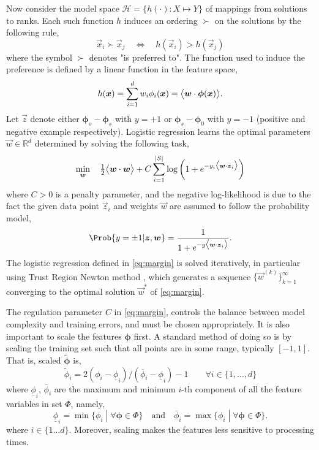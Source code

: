 \documentclass[smallextended]{svjour3}
\renewcommand{\vphi}{\bm \phi}
\begin{document}
Now consider the model space $\mathcal{H} = \{h(\cdot) : X \mapsto Y\}$ of mappings from solutions to ranks. Each such function $h$ induces an ordering $\succ$ on the solutions  by the following rule,
\begin{equation}\label{eq:linear}
\vec{x}_i \succ \vec{x}_j \quad \Leftrightarrow \quad h(\vec{x}_i) > h(\vec{x}_j)
\end{equation}
where the symbol $\succ$ denotes "is preferred to".  The function used to induce the preference is defined by a linear function in the feature space,
\begin{equation}\label{eq:jssp:linweights}
h(\vec{x})=\sum_{i=1}^d w_i\phi_i(\vec{x})=\inner{\vec{w}}{\vphi(\vec{x})}.
\end{equation}
Let $\vec{z}$ denote either $\vphi_o-\vphi_s$ with $y=+1$ or $\vphi_s-\vphi_0$ with $y=-1$ (positive and negative example respectively). Logistic regression learns the optimal parameters $\vec{w}\in\mathbb{R}^d$ determined by solving the following task, 
\begin{equation}\label{eq:margin}
\min_{\vec{w}}\quad \tfrac{1}{2}\inner{\vec{w}}{\vec{w}} + C \sum_{i=1}^{\abs{S}} \log\left(1 + e^{-y_i \inner{\vec{w}}{\vec{z}_i}}\right) 
\end{equation}
where $C > 0$ is a penalty parameter, and the negative log-likelihood is due to the fact the given data point $\vec{z}_i$ and weights $\vec{w}$ are assumed to follow the probability model,
\begin{equation}\label{eq:prob}
\Prob{y=\pm1|\vec{z},\vec{w}}=\frac{1}{1+e^{-y\inner{\vec{w}}{\vec{z}_i}}}.
\end{equation}
The logistic regression defined in \eqref{eq:margin} is solved iteratively, in particular using Trust Region Newton method \cite{Lin08:newtontrustregion}, which generates a sequence $\{\vec{w}^{(k)}\}_{k=1}^\infty$ converging to the optimal solution $\vec{w}^*$ of \eqref{eq:margin}.

The regulation parameter $C$ in \eqref{eq:margin}, controls the balance between model complexity and training errors, and must be chosen appropriately. It is also important to scale the features $\vphi$ first. A standard method of doing so is by scaling the training set such that all points are in some range, typically $[-1,1]$. That is, scaled $\tilde{\vphi}$ is,
\begin{equation}\label{eq:scale}
\tilde{\phi}_i = 2 (\phi_i - \underline{\phi}_i) / (\overline{\phi}_i - \underline{\phi}_i) - 1 
\quad\quad \forall i\in\{1,\ldots,d\}
\end{equation}
where $\underline{\phi}_i$, $\overline{\phi}_i$ are the maximum and minimum $i$-th component of all the feature variables in set $\Phi$, namely,
\begin{equation}
\underline{\phi}_i=\min\{\phi_i\;|\;\forall\vphi\in \Phi\} \quad\textrm{and}\quad \overline{\phi}_i=\max\{\phi_i\;|\;\forall\vphi\in \Phi\}.
\end{equation}
where $i\in\{1\ldots d\}$. Moreover, scaling makes the features less sensitive to processing times.
\end{document}

